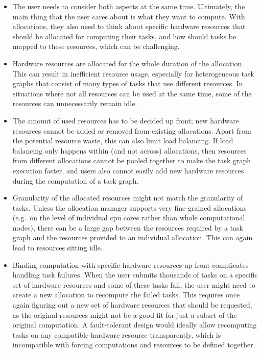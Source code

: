\begin{itemize}[itemsep=0pt]
	\item The user needs to consider both aspects at the same time. Ultimately, the main thing that the user
	      cares about is what they want to compute. With allocations, they also need to think about specific
	      hardware resources that should be allocated for computing their tasks, and how should tasks be
	      mapped to these resources, which can be challenging.
	\item Hardware resources are allocated for the whole duration of the allocation. This can result in
	      inefficient resource usage, especially for heterogeneous task graphs that consist of many types of
	      tasks that use different resources. In situations where not all resources can be used at the same
	      time, some of the resources can unnecessarily remain idle.
	\item The amount of used resources has to be decided up front; new hardware resources cannot be added or
	      removed from existing allocations. Apart from the potential resource waste, this can also limit
	      load balancing. If load balancing only happens within (and not across) allocations, then resources
	      from different allocations cannot be pooled together to make the task graph execution faster, and
	      users also cannot easily add new hardware resources during the computation of a task graph.
	\item Granularity of the allocated resources might not match the granularity of tasks. Unless the
	      allocation manager supports very fine-grained allocations (e.g.\ on the level of individual
	      \gls{cpu} cores rather than whole computational nodes), there can be a large gap
	      between the resources required by a task graph and the resources provided to an individual
	      allocation. This can again lead to resources sitting idle.
	\item Binding computation with specific hardware resources up front complicates handling task failures.
	      When the user submits thousands of tasks on a specific set of hardware resources and some of these
	      tasks fail, the user might need to create a new allocation to recompute the failed tasks. This
	      requires once again figuring out a new set of hardware resources that should be requested, as the
	      original resources might not be a good fit for just a subset of the original computation. A
	      fault-tolerant design would ideally allow recomputing tasks on any compatible hardware resource
	      transparently, which is incompatible with forcing computations and resources to be defined
	      together.
\end{itemize}

